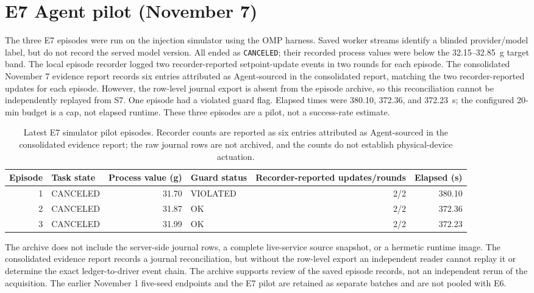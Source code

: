 \documentclass[10pt]{article}
\begin{document}
\section*{E7 Agent pilot (November 7)}
The three E7 episodes were run on the injection simulator using the OMP harness. Saved worker streams identify a blinded provider/model label, but do not record the served model version. All ended as \texttt{CANCELED}; their recorded process values were below the 32.15--32.85~g target band. The local episode recorder logged two recorder-reported setpoint-update events in two rounds for each episode. The consolidated November 7 evidence report records six entries attributed as Agent-sourced in the consolidated report, matching the two recorder-reported updates for each episode. However, the row-level journal export is absent from the episode archive, so this reconciliation cannot be independently replayed from S7. One episode had a violated guard flag. Elapsed times were 380.10, 372.36, and 372.23~s; the configured 20-min budget is a cap, not elapsed runtime. These three episodes are a pilot, not a success-rate estimate.

\begin{table}[htbp]
\centering
\caption{Latest E7 simulator pilot episodes. Recorder counts are reported as six entries attributed as Agent-sourced in the consolidated evidence report; the raw journal rows are not archived, and the counts do not establish physical-device actuation.}
\label{tab:s7-e7}
\footnotesize
\begin{tabular}{@{}r l r l r r@{}}
\toprule
Episode & Task state & Process value (g) & Guard status & Recorder-reported updates/rounds & Elapsed (s) \\
\midrule
1 & CANCELED & 31.70 & VIOLATED & 2/2 & 380.10 \\
2 & CANCELED & 31.87 & OK & 2/2 & 372.36 \\
3 & CANCELED & 31.99 & OK & 2/2 & 372.23 \\
\bottomrule
\end{tabular}
\end{table}

The archive does not include the server-side journal rows, a complete live-service source snapshot, or a hermetic runtime image. The consolidated evidence report records a journal reconciliation, but without the row-level export an independent reader cannot replay it or determine the exact ledger-to-driver event chain. The archive supports review of the saved episode records, not an independent rerun of the acquisition. The earlier November 1 five-seed endpoints and the E7 pilot are retained as separate batches and are not pooled with E6.
\end{document}
